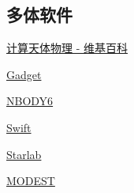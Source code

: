 \subsection{多体软件}

\href{https://en.wikipedia.org/wiki/Computational_astrophysics}{计算天体物理 - 维基百科}

\href{https://wwwmpa.mpa-garching.mpg.de/gadget/}{Gadget}

\href{https://people.ast.cam.ac.uk/~sverre/web/pages/nbody.htm}{NBODY6}

\href{https://www.boulder.swri.edu/~hal/swift.html}{Swift}

\href{https://www.sns.ias.edu/~starlab/}{Starlab}

\href{http://www.manybody.org/modest/}{MODEST}
